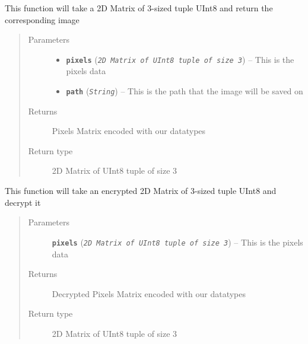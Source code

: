 \documentclass[letterpaper,10pt,english]{sphinxmanual}
\begin{document}
\begin{fulllineitems}
\label{demo:demo.ImageUtils.decode}
This function will take a 2D Matrix of 3-sized tuple UInt8 and return the corresponding image
\begin{quote}\begin{description}
\item[{Parameters}] \leavevmode\begin{itemize}
\item {} 
\textbf{\texttt{pixels}} (\emph{\texttt{2D Matrix of UInt8 tuple of size 3}}) -- This is the pixels data

\item {} 
\textbf{\texttt{path}} (\emph{\texttt{String}}) -- This is the path that the image will be saved on

\end{itemize}

\item[{Returns}] \leavevmode
Pixels Matrix encoded with our datatypes

\item[{Return type}] \leavevmode
2D Matrix of UInt8 tuple of size 3

\end{description}\end{quote}

\end{fulllineitems}


\begin{fulllineitems}
\label{demo:demo.ImageUtils.decrypt}
This function will take an encrypted 2D Matrix of 3-sized tuple UInt8 and decrypt it
\begin{quote}\begin{description}
\item[{Parameters}] \leavevmode
\textbf{\texttt{pixels}} (\emph{\texttt{2D Matrix of UInt8 tuple of size 3}}) -- This is the pixels data

\item[{Returns}] \leavevmode
Decrypted Pixels Matrix encoded with our datatypes

\item[{Return type}] \leavevmode
2D Matrix of UInt8 tuple of size 3

\end{description}\end{quote}

\end{fulllineitems}
\end{document}
